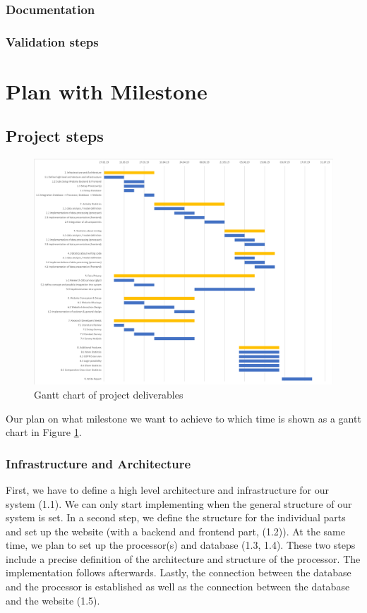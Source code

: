 \documentclass{seal_article}
\begin{document}
\subsubsection{Documentation}
\subsubsection{Validation steps}

\section{Plan with Milestone}
\subsection{Project steps}
\begin{figure}
  \includegraphics[width=\linewidth]{images/project_structure.png}
  \caption{Gantt chart of project deliverables}
  \label{fig:gantt}
\end{figure}

Our plan on what milestone we want to achieve to which time is shown as a gantt chart in Figure \ref{fig:gantt}.

\subsubsection{Infrastructure and Architecture}
First, we have to define a high level architecture and infrastructure for our system (1.1). We can only start implementing when the general structure of our system is set. In a second step, we define the structure for the individual parts and set up the website (with a backend and frontend part, (1.2)). At the same time, we plan to set up the processor(s) and database (1.3, 1.4). These two steps include a precise definition of the architecture and structure of the processor. The implementation follows afterwards. Lastly, the connection between the database and the processor is established as well as the connection between the database and the website (1.5).
\end{document}
